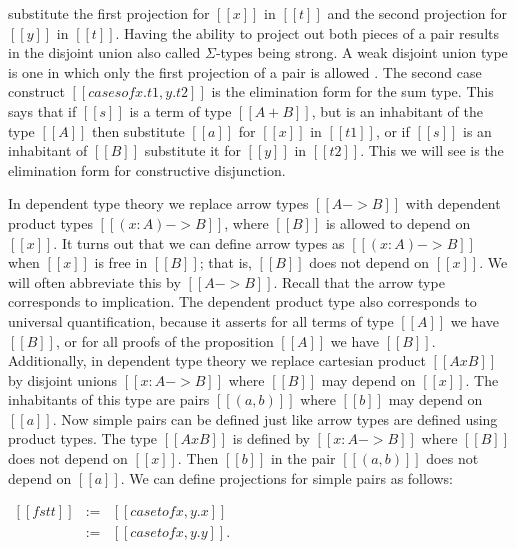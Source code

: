 substitute the first projection for $[[x]]$ in $[[t]]$ and the second
projection for $[[y]]$ in $[[t]]$.  Having the ability to project out
both pieces of a pair results in the disjoint union also called
$\Sigma$-types being strong.  A weak disjoint union type is one in
which only the first projection of a pair is allowed .  The second case
construct $[[case s of x.t1,y.t2]]$ is the elimination form for the
sum type.  This says that if $[[s]]$ is a term of type $[[A+B]]$, but
is an inhabitant of the type $[[A]]$ then substitute $[[a]]$ for
$[[x]]$ in $[[t1]]$, or if $[[s]]$ is an inhabitant of $[[B]]$
substitute it for $[[y]]$ in $[[t2]]$.  This we will see is the
elimination form for constructive disjunction.

In dependent type theory we replace arrow types $[[A -> B]]$ with
dependent product types $[[(x : A) -> B]]$, where $[[B]]$ is allowed
to depend on $[[x]]$.  It turns out that we can define arrow types as
$[[(x : A) -> B]]$ when $[[x]]$ is free in $[[B]]$; that is, $[[B]]$
does not depend on $[[x]]$.  We will often abbreviate this by $[[A ->
B]]$.  Recall that the arrow type corresponds to implication.  The
dependent product type also corresponds to universal quantification,
because it asserts for all terms of type $[[A]]$ we have $[[B]]$, or
for all proofs of the proposition $[[A]]$ we have $[[B]]$.
Additionally, in dependent type theory we replace cartesian product
$[[A x B]]$ by disjoint unions $[[{x : A} -> B]]$ where $[[B]]$ may
depend on $[[x]]$.  The inhabitants of this type are pairs $[[(a,b)]]$
where $[[b]]$ may depend on $[[a]]$.  Now simple pairs can be defined
just like arrow types are defined using product types.  The type $[[A
x B]]$ is defined by $[[{x : A} -> B]]$ where $[[B]]$ does not depend
on $[[x]]$.  Then $[[b]]$ in the pair $[[(a,b)]]$ does not depend on
$[[a]]$.  We can define projections for simple pairs as follows:
\begin{center}
  \begin{math}
    \begin{array}{lll}
      [[fst t]] & := & [[case t of x,y.x]]\\
      [[snd t]] & := & [[case t of x,y.y]].
    \end{array}
  \end{math}
\end{center}

